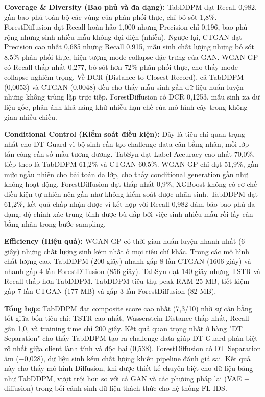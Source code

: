 \textbf{Coverage \& Diversity (Bao phủ và đa dạng):} TabDDPM đạt Recall 0,982, gần bao phủ toàn bộ các vùng của phân phối thực, chỉ bỏ sót 1,8\%. ForestDiffusion đạt Recall hoàn hảo 1,000 nhưng Precision chỉ 0,196, bao phủ rộng nhưng sinh nhiều mẫu không đại diện (nhiễu). Ngược lại, CTGAN đạt Precision cao nhất 0,685 nhưng Recall 0,915, mẫu sinh chất lượng nhưng bỏ sót 8,5\% phân phối thực, hiện tượng mode collapse đặc trưng của GAN. WGAN-GP có Recall thấp nhất 0,277, bỏ sót hơn 72\% phân phối thực, cho thấy mode collapse nghiêm trọng. Về DCR (Distance to Closest Record), cả TabDDPM (0,0053) và CTGAN (0,0048) đều cho thấy mẫu sinh gần dữ liệu huấn luyện nhưng không trùng lặp trực tiếp. ForestDiffusion có DCR 0,1253, mẫu sinh xa dữ liệu gốc, phản ánh khả năng khử nhiễu hạn chế của mô hình cây trong không gian nhiều chiều.

\textbf{Conditional Control (Kiểm soát điều kiện):} Đây là tiêu chí quan trọng nhất cho DT-Guard vì bộ sinh cần tạo challenge data cân bằng nhãn, mỗi lớp tấn công cần số mẫu tương đương. TabSyn đạt Label Accuracy cao nhất 70,0\%, tiếp theo là TabDDPM 61,2\% và CTGAN 60,5\%. WGAN-GP chỉ đạt 51,9\%, gần mức ngẫu nhiên cho bài toán đa lớp, cho thấy conditional generation gần như không hoạt động. ForestDiffusion đạt thấp nhất 0,9\%, XGBoost không có cơ chế điều kiện tự nhiên nên gần như không kiểm soát được nhãn sinh. TabDDPM đạt 61,2\%, kết quả chấp nhận được vì kết hợp với Recall 0,982 đảm bảo bao phủ đa dạng; độ chính xác trung bình được bù đắp bởi việc sinh nhiều mẫu rồi lấy cân bằng nhãn trong bước sampling.

\textbf{Efficiency (Hiệu quả):} WGAN-GP có thời gian huấn luyện nhanh nhất (6 giây) nhưng chất lượng sinh kém nhất ở mọi tiêu chí khác. Trong các mô hình chất lượng cao, TabDDPM (200 giây) nhanh gấp 8 lần CTGAN (1606 giây) và nhanh gấp 4 lần ForestDiffusion (856 giây). TabSyn đạt 140 giây nhưng TSTR và Recall thấp hơn TabDDPM. TabDDPM tiêu thụ peak RAM 25 MB, tiết kiệm gấp 7 lần CTGAN (177 MB) và gấp 3 lần ForestDiffusion (82 MB).

\textbf{Tổng hợp:} TabDDPM đạt composite score cao nhất (7,3/10) nhờ sự cân bằng tốt giữa bốn tiêu chí: TSTR cao nhất, Wasserstein Distance thấp nhất, Recall gần 1,0, và training time chỉ 200 giây. Kết quả quan trọng nhất ở hàng "DT Separation" cho thấy TabDDPM tạo ra challenge data giúp DT-Guard phân biệt rõ nhất giữa client lành tính và độc hại (0,538). ForestDiffusion có DT Separation âm ($-$0,028), dữ liệu sinh kém chất lượng khiến pipeline đánh giá sai. Kết quả này cho thấy mô hình Diffusion, khi được thiết kế chuyên biệt cho dữ liệu bảng như TabDDPM, vượt trội hơn so với cả GAN và các phương pháp lai (VAE + diffusion) trong bối cảnh sinh dữ liệu thách thức cho hệ thống FL-IDS.

